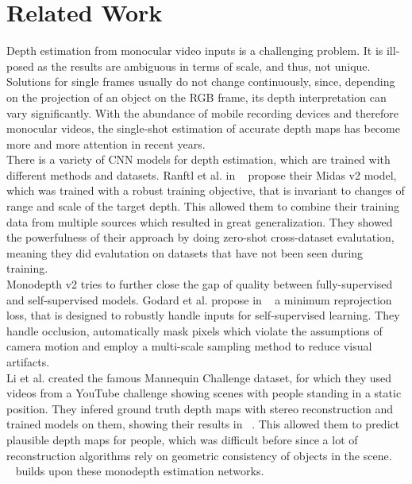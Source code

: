 \chapter{Related Work}
    Depth estimation from monocular video inputs is a challenging problem.
    It is ill-posed as the results are ambiguous in terms of scale, and thus, not unique.
    Solutions for single frames usually do not change continuously, since, depending on the projection of an object on the RGB frame, its depth interpretation can vary significantly.
    With the abundance of mobile recording devices and therefore monocular videos, the single-shot estimation of accurate depth maps has become more and more attention in recent years.\\
    There is a variety of CNN models for depth estimation, which are trained with different methods and datasets.
    Ranftl et al. in ~\cite{ranftl2020robust} propose their Midas v2 model, which was trained with a robust training objective, that is invariant to changes of range and scale of the target depth.
    This allowed them to combine their training data from multiple sources which resulted in great generalization.
    They showed the powerfulness of their approach by doing zero-shot cross-dataset evalutation, meaning they did evalutation on datasets that have not been seen during training.\\
    Monodepth v2 tries to further close the gap of quality between fully-supervised and self-supervised models.
    Godard et al. propose in ~\cite{godard2019digging} a minimum reprojection loss, that is designed to robustly handle inputs for self-supervised learning.
    They handle occlusion, automatically mask pixels which violate the assumptions of camera motion and employ a multi-scale sampling method to reduce visual artifacts.\\
    Li et al. created the famous Mannequin Challenge dataset, for which they used videos from a YouTube challenge showing scenes with people standing in a static position.
    They infered ground truth depth maps with stereo reconstruction and trained models on them, showing their results in ~\cite{mannequin}.
    This allowed them to predict plausible depth maps for people, which was difficult before since a lot of reconstruction algorithms rely on geometric consistency of objects in the scene.\\
    ~\cite{luo2020consistent} builds upon these monodepth estimation networks.
